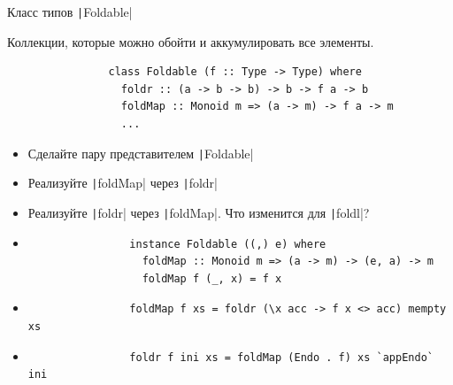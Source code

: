     \begin{frame}[fragile]{Класс типов \texttt|Foldable|}
        \begin{block}{}
            Коллекции, которые можно обойти и аккумулировать все элементы.
            \begin{verbatim}
                class Foldable (f :: Type -> Type) where
                  foldr :: (a -> b -> b) -> b -> f a -> b
                  foldMap :: Monoid m => (a -> m) -> f a -> m
                  ...
            \end{verbatim}
        \end{block}
        \begin{itemize}
            \item[\todo] Сделайте пару представителем \texttt|Foldable|
            \item[\todo] Реализуйте \texttt|foldMap| через \texttt|foldr|
            \item[\todo] Реализуйте \texttt|foldr| через \texttt|foldMap|. Что изменится для \texttt|foldl|?
            \item[\answer] \pause
            \begin{verbatim}
                instance Foldable ((,) e) where
                  foldMap :: Monoid m => (a -> m) -> (e, a) -> m
                  foldMap f (_, x) = f x
            \end{verbatim}
            \item[\answer] \pause
            \begin{verbatim}
                foldMap f xs = foldr (\x acc -> f x <> acc) mempty xs
            \end{verbatim}
            \item[\answer] \pause
            \begin{verbatim}
                foldr f ini xs = foldMap (Endo . f) xs `appEndo` ini
            \end{verbatim}
        \end{itemize}
    \end{frame}

